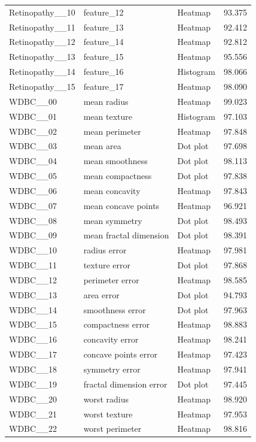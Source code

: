 \begin{longtable}{p{2.7cm}p{5.5cm}p{3.4cm}r}
Retinopathy\_\_10 & feature\_12 & Heatmap & 93.375\\
Retinopathy\_\_11 & feature\_13 & Heatmap & 92.412\\
Retinopathy\_\_12 & feature\_14 & Heatmap & 92.812\\
Retinopathy\_\_13 & feature\_15 & Heatmap & 95.556\\
Retinopathy\_\_14 & feature\_16 & Histogram & 98.066\\
Retinopathy\_\_15 & feature\_17 & Heatmap & 98.090\\
WDBC\_\_00 & mean radius & Heatmap & 99.023\\
WDBC\_\_01 & mean texture & Histogram & 97.103\\
WDBC\_\_02 & mean perimeter & Heatmap & 97.848\\
WDBC\_\_03 & mean area & Dot plot & 97.698\\
WDBC\_\_04 & mean smoothness & Dot plot & 98.113\\
WDBC\_\_05 & mean compactness & Dot plot & 97.838\\
WDBC\_\_06 & mean concavity & Heatmap & 97.843\\
WDBC\_\_07 & mean concave points & Heatmap & 96.921\\
WDBC\_\_08 & mean symmetry & Dot plot & 98.493\\
WDBC\_\_09 & mean fractal dimension & Dot plot & 98.391\\
WDBC\_\_10 & radius error & Heatmap & 97.981\\
WDBC\_\_11 & texture error & Dot plot & 97.868\\
WDBC\_\_12 & perimeter error & Heatmap & 98.585\\
WDBC\_\_13 & area error & Dot plot & 94.793\\
WDBC\_\_14 & smoothness error & Dot plot & 97.963\\
WDBC\_\_15 & compactness error & Heatmap & 98.883\\
WDBC\_\_16 & concavity error & Heatmap & 98.241\\
WDBC\_\_17 & concave points error & Heatmap & 97.423\\
WDBC\_\_18 & symmetry error & Heatmap & 97.941\\
WDBC\_\_19 & fractal dimension error & Dot plot & 97.445\\
WDBC\_\_20 & worst radius & Heatmap & 98.920\\
WDBC\_\_21 & worst texture & Heatmap & 97.953\\
WDBC\_\_22 & worst perimeter & Heatmap & 98.816\\

\end{longtable}
